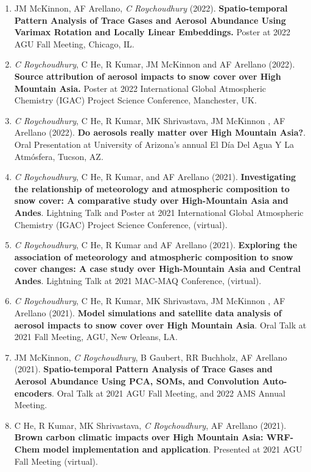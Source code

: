 \documentclass[margin,line]{resume}
\begin{document}
\begin{resume}
\begin{enumerate}[topsep=1pt, partopsep=1pt, itemsep=0.5pt, parsep=0.1pt, leftmargin=15pt,label=\arabic*.]
			\item JM McKinnon, AF Arellano, \textit{C Roychoudhury} (2022). \textbf{Spatio-temporal Pattern Analysis of Trace Gases and Aerosol Abundance Using Varimax Rotation and Locally Linear Embeddings.} Poster at 2022 AGU Fall Meeting, Chicago, IL.
			
			\item \textit{C Roychoudhury}, C He, R Kumar, JM McKinnon and AF Arellano (2022). 
			\textbf{Source attribution of aerosol impacts to snow cover over High Mountain Asia.} Poster at 2022 International Global Atmospheric Chemistry (IGAC) Project Science Conference, Manchester, UK.
			
			\item \textit{C Roychoudhury}, C He, R Kumar, MK Shrivastava, JM McKinnon , AF Arellano (2022).
			\textbf{Do aerosols really matter over High Mountain Asia?}.
			Oral Presentation at University of Arizona's annual El Día Del Agua Y La Atmósfera, Tucson, AZ.
			
			\item \textit{C Roychoudhury}, C He, R Kumar, and AF Arellano (2021).
			\textbf{Investigating the relationship of meteorology and atmospheric composition to snow cover: A comparative study over High-Mountain Asia and Andes}.
			Lightning Talk and Poster at 2021 International Global Atmospheric Chemistry (IGAC) Project Science Conference, (virtual).
			
			\item \textit{C Roychoudhury}, C He, R Kumar and AF Arellano (2021).
		\textbf{Exploring the association of meteorology and atmospheric composition to snow cover changes: A case study over High-Mountain Asia and Central Andes}. 
	Lightning Talk at 2021 MAC-MAQ Conference, (virtual).
			
			\item \textit{C Roychoudhury}, C He, R Kumar, MK Shrivastava, JM McKinnon , AF Arellano (2021). 
			\textbf{Model simulations and satellite data analysis of aerosol impacts to snow cover over High Mountain Asia}. 
			Oral Talk at 2021 Fall Meeting, AGU, New Orleans, LA.
			
			\item JM McKinnon, \textit{C Roychoudhury}, B Gaubert, RR Buchholz, AF Arellano (2021).
			\textbf{Spatio-temporal Pattern Analysis of Trace Gases and Aerosol Abundance Using PCA, SOMs, and Convolution Auto-encoders}.
			Oral Talk at 2021 AGU Fall Meeting, and 2022 AMS Annual Meeting.
			
			\item C He, R Kumar, MK Shrivastava, \textit{C Roychoudhury}, AF Arellano (2021).
			\textbf{Brown carbon climatic impacts over High Mountain Asia: WRF-Chem model implementation and application}.
			Presented at 2021 AGU Fall Meeting (virtual).
			

\end{enumerate}
\end{resume}
\end{document}
